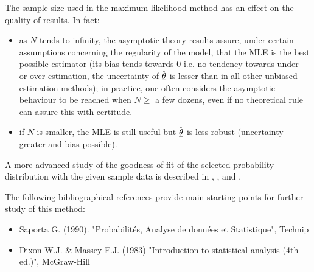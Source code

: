 {
  The sample size used in the maximum likelihood method has an effect on the quality of results. In fact:
  
  \begin{itemize} 
  \item	as $N$ tends to infinity, the asymptotic theory results assure, under certain assumptions concerning the regularity of the model, that the MLE is the best possible estimator (its bias tends towards 0 i.e. no tendency towards under- or over-estimation, the uncertainty of  $\hat{{\underline{\theta}}}$ is lesser than in all other unbiased estimation methods); in practice, one often considers the asymptotic behaviour to be reached when $N \geq$ a few dozens, even if no theoretical rule can assure this with certitude. 
  \item if $N$ is smaller, the MLE is still useful but $\hat{{\underline{\theta}}}$ is less robust (uncertainty greater and bias possible).
  \end{itemize}
  
  A more advanced study of the goodness-of-fit of the selected probability distribution with the given sample data is described in  , ,  and .
  
  The following bibliographical references provide main starting points for further study of  this method:
  \begin{itemize}
  \item Saporta G. (1990). "Probabilités, Analyse de données et Statistique", Technip
  \item Dixon W.J. \& Massey F.J. (1983) "Introduction to statistical analysis (4th ed.)", McGraw-Hill
  \end{itemize}
}
